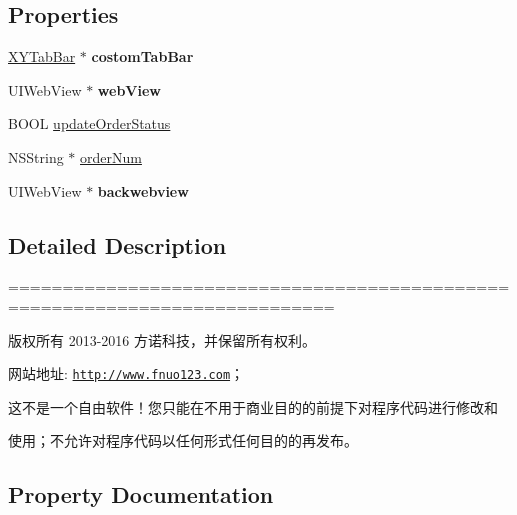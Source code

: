 \subsection*{Properties}
\begin{DoxyCompactItemize}
\item 
\mbox{\label{category_x_y_tab_bar_view_controller_07_08_a14c4d5f6abec4ce9a0f40f6069513ad5}} 
\mbox{\hyperlink{interface_x_y_tab_bar}{X\+Y\+Tab\+Bar}} $\ast$ {\bfseries costom\+Tab\+Bar}
\item 
\mbox{\label{category_x_y_tab_bar_view_controller_07_08_ab3de707a3f3b8dd2fdd26f81a292384e}} 
U\+I\+Web\+View $\ast$ {\bfseries web\+View}
\item 
B\+O\+OL \mbox{\hyperlink{category_x_y_tab_bar_view_controller_07_08_af097c12f9b43d773f3d6fd0d407ace81}{update\+Order\+Status}}
\item 
N\+S\+String $\ast$ \mbox{\hyperlink{category_x_y_tab_bar_view_controller_07_08_ad8d40b4e952cfc255e1a4a05fbeca69a}{order\+Num}}
\item 
\mbox{\label{category_x_y_tab_bar_view_controller_07_08_a7a6cd226bf8961949760d4f4b384c62c}} 
U\+I\+Web\+View $\ast$ {\bfseries backwebview}
\end{DoxyCompactItemize}


\subsection{Detailed Description}
============================================================================

版权所有 2013-\/2016 方诺科技，并保留所有权利。

网站地址\+: \href{http://www.fnuo123.com}{\tt http\+://www.\+fnuo123.\+com}； 



这不是一个自由软件！您只能在不用于商业目的的前提下对程序代码进行修改和

使用；不允许对程序代码以任何形式任何目的的再发布。 

 

\subsection{Property Documentation}
\mbox{\label{category_x_y_tab_bar_view_controller_07_08_ad8d40b4e952cfc255e1a4a05fbeca69a}} 
